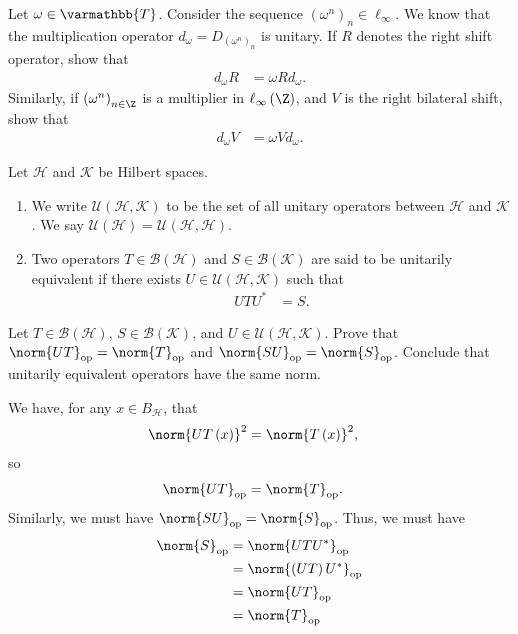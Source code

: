 \documentclass[10pt]{mypackage}
\renewcommand*{\mathbb}[1]{\varmathbb{#1}}
\begin{document}
\begin{exercise}
  Let $\omega\in \mathbb{T}$. Consider the sequence $\left(\omega^n\right)_n\in \ell_{\infty}$. We know that the multiplication operator $d_{\omega} = D_{\left(\omega^n\right)_n}$ is unitary. If $R$ denotes the right shift operator, show that
  \begin{align*}
    d_\omega R &= \omega R d_{\omega}.
  \end{align*}
  Similarly, if $\left(\omega^n\right)_{n\in \Z}$ is a multiplier in $\ell_{\infty}\left(\Z\right)$, and $V$ is the right bilateral shift, show that
  \begin{align*}
    d_{\omega}V &= \omega V d_{\omega}.
  \end{align*}
\end{exercise}
\begin{definition}
  Let $\mathcal{H}$ and $\mathcal{K}$ be Hilbert spaces.
  \begin{enumerate}[(1)]
    \item We write $\mathcal{U}\left(\mathcal{H},\mathcal{K}\right)$ to be the set of all unitary operators between $\mathcal{H}$ and $\mathcal{K}$. We say $\mathcal{U}\left(\mathcal{H}\right) = \mathcal{U}\left(\mathcal{H},\mathcal{H}\right)$.
    \item Two operators $T\in \mathcal{B}\left(\mathcal{H}\right)$ and $S\in \mathcal{B}\left(\mathcal{K}\right)$ are said to be unitarily equivalent if there exists $U\in \mathcal{U}\left(\mathcal{H},\mathcal{K}\right)$ such that
      \begin{align*}
        UTU^{\ast} &= S.
      \end{align*}
  \end{enumerate}
\end{definition}
\begin{exercise}
  Let $T\in \mathcal{B}\left(\mathcal{H}\right)$, $S\in \mathcal{B}\left(\mathcal{K}\right)$, and $U\in \mathcal{U}\left(\mathcal{H},\mathcal{K}\right)$. Prove that $\norm{UT}_{\text{op}} = \norm{T}_{\text{op}}$ and $\norm{SU}_{\text{op}} = \norm{S}_{\text{op}}$. Conclude that unitarily equivalent operators have the same norm.
\end{exercise}
\begin{solution}
  We have, for any $x\in B_{\mathcal{H}}$, that
  \begin{align*}
    \norm{UT\left(x\right)}^2 &= \norm{T\left(x\right)}^2,
  \end{align*}
  so
  \begin{align*}
    \norm{UT}_{\text{op}} &= \norm{T}_{\text{op}}.
  \end{align*}
  Similarly, we must have $\norm{SU}_{\text{op}} = \norm{S}_{\text{op}}$. Thus, we must have
  \begin{align*}
    \norm{S}_{\text{op}} &= \norm{UTU^{\ast}}_{\text{op}}\\
                         &= \norm{\left(UT\right)U^{\ast}}_{\text{op}}\\
                                  &= \norm{UT}_{\text{op}}\\
                                  &= \norm{T}_{\text{op}}
  \end{align*}
\end{solution}
\end{document}
